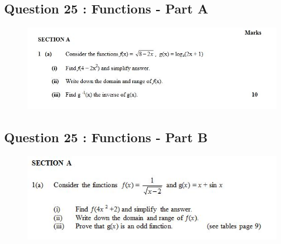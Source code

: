 \documentclass[]{article}
\begin{document}
\newpage
\subsection*{Question 25 : Functions - Part A}

\begin{figure}[h!]
	\centering
	\includegraphics[width=0.9\linewidth]{Week7tut1}
\end{figure}

\subsection*{Question 25 : Functions - Part B}
\begin{figure}[h!]
	\centering
	\includegraphics[width=1\linewidth]{Week7tut2}
\end{figure}
\newpage
\end{document}
